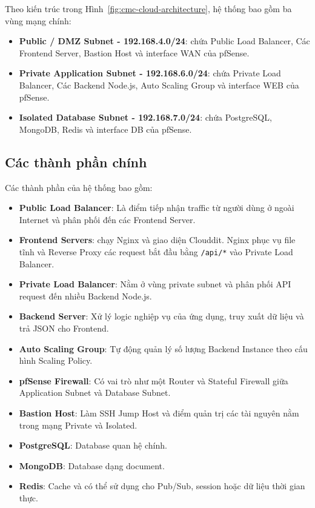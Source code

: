 \documentclass[12pt, a4paper]{article}
\begin{document}
Theo kiến trúc trong Hình~\ref{fig:cmc-cloud-architecture},
hệ thống bao gồm ba vùng mạng chính:

\begin{itemize}
    \item \textbf{Public / DMZ Subnet - 192.168.4.0/24}: chứa Public Load Balancer, Các Frontend Server, Bastion Host và interface WAN của pfSense.

    \item \textbf{Private Application Subnet - 192.168.6.0/24}: chứa
    Private Load Balancer, Các Backend Node.js, Auto Scaling Group
    và interface WEB của pfSense.

    \item \textbf{Isolated Database Subnet - 192.168.7.0/24}: chứa
    PostgreSQL, MongoDB, Redis và interface DB của pfSense.
\end{itemize}

\subsection{Các thành phần chính}

Các thành phần của hệ thống bao gồm:

\begin{itemize}
    \item \textbf{Public Load Balancer}: Là điểm tiếp nhận traffic từ người dùng ở ngoài Internet và phân phối đến các Frontend Server.

    \item \textbf{Frontend Servers}: chạy Nginx và giao diện Clouddit.
    Nginx phục vụ file tĩnh và Reverse Proxy các request bắt đầu bằng \texttt{/api/*}
    vào Private Load Balancer.

    \item \textbf{Private Load Balancer}: Nằm ở vùng private subnet và phân phối API request đến nhiều Backend Node.js.

    \item \textbf{Backend Server}: Xử lý logic nghiệp vụ của ứng dụng,
    truy xuất dữ liệu và trả JSON cho Frontend.

    \item \textbf{Auto Scaling Group}: Tự động quản lý số lượng
    Backend Instance theo cấu hình Scaling Policy.

    \item \textbf{pfSense Firewall}: Có vai trò như một Router và Stateful Firewall giữa Application Subnet và Database Subnet.

    \item \textbf{Bastion Host}: Làm SSH Jump Host và điểm quản trị
    các tài nguyên nằm trong mạng Private và Isolated.

    \item \textbf{PostgreSQL}: Database quan hệ chính.

    \item \textbf{MongoDB}: Database dạng document.

    \item \textbf{Redis}: Cache và có thể sử dụng cho Pub/Sub,
    session hoặc dữ liệu thời gian thực.
\end{itemize}
\end{document}
